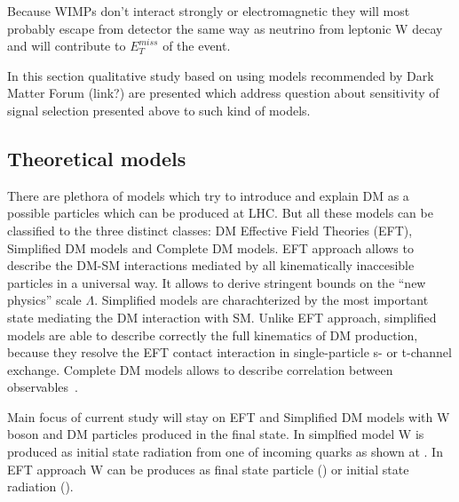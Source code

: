 Because WIMPs don't interact strongly or electromagnetic they will most probably escape from detector the same way as neutrino
from leptonic W decay and will contribute to $E_{T}^{miss}$ of the event.

In this section qualitative study based on using models recommended by Dark Matter Forum (link?) are presented 
which address question about sensitivity of signal selection presented above to such kind of models.



\subsection{Theoretical models}

There are plethora of models which try to introduce and explain DM as a possible particles which can be produced at LHC. 
But all these models can be classified to the three distinct classes: DM Effective Field Theories (EFT), Simplified DM models 
and Complete DM models. EFT approach allows to describe the DM-SM interactions mediated by all 
kinematically inaccesible particles in a universal way. 
It allows to derive stringent bounds on the ``new physics'' scale $\Lambda$. 
Simplified models are charachterized by the most important state mediating the DM interaction with SM. Unlike EFT approach,
simplified models are able to describe correctly the full kinematics of DM production, because they resolve the EFT contact interaction in single-particle 
s- or t-channel exchange. Complete DM models allows to describe correlation between observables~\cite{arXiv:1506.03116}.

Main focus of current study will stay on EFT and Simplified DM models with W boson and DM particles produced in the final state. 
In simplfied model W is produced as initial state radiation from one of incoming quarks as shown at . 
In EFT approach W can be produces as final state particle () or initial state radiation ().


